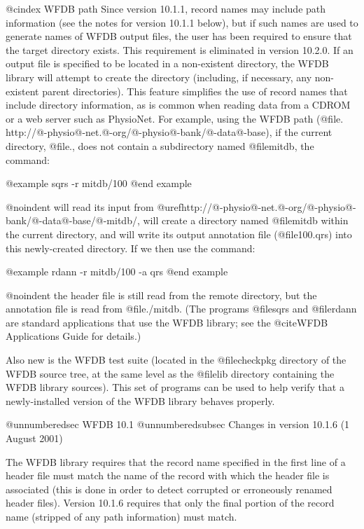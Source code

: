 {{{{{{{{@cindex WFDB path
Since version 10.1.1, record names may include path information (see the notes
for version 10.1.1 below), but if such names are used to generate names of WFDB
output files, the user has been required to ensure that the target directory
exists.  This requirement is eliminated in version 10.2.0.  If an output file
is specified to be located in a non-existent directory, the WFDB library will
attempt to create the directory (including, if necessary, any non-existent
parent directories).  This feature simplifies the use of record names that
include directory information, as is common when reading data from a CDROM or
a web server such as PhysioNet.  For example, using the WFDB path
(@file{. http://@-physio@-net.@-org/@-physio@-bank/@-data@-base}), if the
current directory, @file{.}, does not contain a subdirectory named
@file{mitdb}, the command:

@example
sqrs -r mitdb/100
@end example

@noindent
will read its input from
@uref{http://@-physio@-net.@-org/@-physio@-bank/@-data@-base/@-mitdb/},
will create a directory named @file{mitdb} within the current directory, and
will write its output annotation file (@file{100.qrs}) into this newly-created
directory.  If we then use the command:

@example
rdann -r mitdb/100 -a qrs
@end example

@noindent
the header file is still read from the remote directory, but the annotation
file is read from @file{./mitdb}.  (The programs @file{sqrs} and @file{rdann}
are standard applications that use the WFDB library;  see the @cite{WFDB
Applications Guide} for details.)

Also new is the WFDB test suite (located in the @file{checkpkg} directory of
the WFDB source tree, at the same level as the @file{lib} directory containing
the WFDB library sources).  This set of programs can be used to help verify
that a newly-installed version of the WFDB library behaves properly.

@unnumberedsec WFDB 10.1
@unnumberedsubsec Changes in version 10.1.6 (1 August 2001)

The WFDB library requires that the record name specified in the first line
of a header file must match the name of the record with which the header file
is associated (this is done in order to detect corrupted or erroneously
renamed header files).  Version 10.1.6 requires that only the final portion of
the record name (stripped of any path information) must match.

}}}}}}}}
